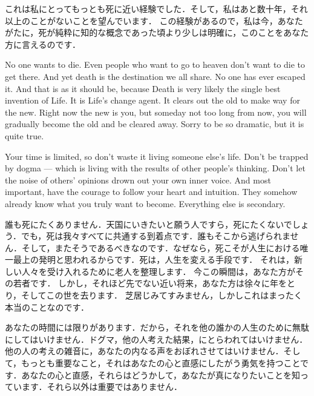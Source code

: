 \documentclass[twocolumn]{jsarticle}
\begin{document}
\vspace{\baselineskip}
\vspace{\baselineskip}

これは私にとってもっとも死に近い経験でした．そして，私はあと数十年，それ以上のことがないことを望んでいます．
この経験があるので，私は今，あなたがたに，死が純粋に知的な概念であった頃より少しは明確に，このことをあなた方に言えるのです．

\newpage

No one wants to die. Even people who want to go to heaven don't want to die to get there. And yet death is the destination we all share. No one has ever escaped it. And that is as it should be, because Death is very likely the single best invention of Life. It is Life's change agent. It clears out the old to make way for the new. Right now the new is you, but someday not too long from now, you will gradually become the old and be cleared away. Sorry to be so dramatic, but it is quite true.

\vspace{\baselineskip}


Your time is limited, so don't waste it living someone else's life. Don't be trapped by dogma — which is living with the results of other people's thinking. Don't let the noise of others' opinions drown out your own inner voice. And most important, have the courage to follow your heart and intuition. They somehow already know what you truly want to become. Everything else is secondary.

\newpage

誰も死にたくありません．天国にいきたいと願う人ですら，死にたくないでしょう．でも，死は我々すべてに共通する到着点です．誰もそこから逃げられません．そして，またそうであるべきなのです．なぜなら，死こそが人生における唯一最上の発明と思われるからです．死は，人生を変える手段です．
それは，新しい人々を受け入れるために老人を整理します．
今この瞬間は，あなた方がその若者です．
しかし，それほど先でない近い将来，あなた方は徐々に年をとり，そしてこの世を去ります．
芝居じみてすみません，しかしこれはまったく本当のことなのです．

あなたの時間には限りがあります．だから，それを他の誰かの人生のために無駄にしてはいけません．ドグマ，他の人考えた結果，にとらわれてはいけません．他の人の考えの雑音に，あなたの内なる声をおぼれさせてはいけません．そして，もっとも重要なこと，それはあなたの心と直感にしたがう勇気を持つことです．あなたの心と直感，それらはどうかして，あなたが真になりたいことを知っています．それら以外は重要ではありません．
\end{document}
